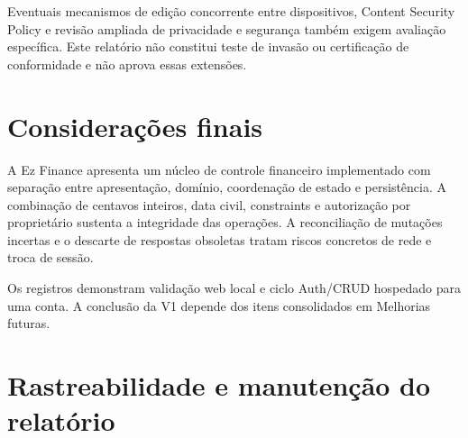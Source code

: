 \documentclass[
    12pt,
    oneside,
    a4paper,
    brazil
]{abntex2}
\begin{document}
Eventuais mecanismos de edição concorrente entre dispositivos, Content Security Policy e revisão ampliada de privacidade e segurança também exigem avaliação específica. Este relatório não constitui teste de invasão ou certificação de conformidade e não aprova essas extensões.

\chapter{Considerações finais}

A Ez Finance apresenta um núcleo de controle financeiro implementado com separação entre apresentação, domínio, coordenação de estado e persistência. A combinação de centavos inteiros, data civil, constraints e autorização por proprietário sustenta a integridade das operações. A reconciliação de mutações incertas e o descarte de respostas obsoletas tratam riscos concretos de rede e troca de sessão.

Os registros demonstram validação web local e ciclo Auth/CRUD hospedado para uma conta. A conclusão da V1 depende dos itens consolidados em Melhorias futuras.

\appendix
\chapter{Rastreabilidade e manutenção do relatório}
\end{document}
